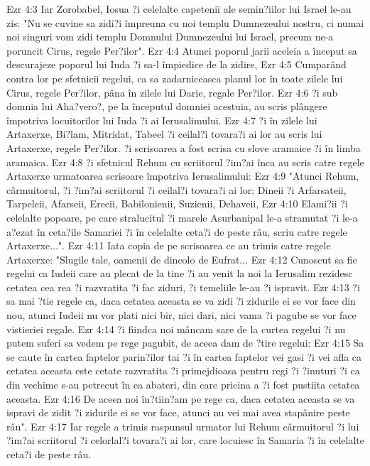 Ezr 4:3  Iar Zorobabel, Iosua ?i celelalte capetenii ale semin?iilor lui Israel le-au zis: "Nu se cuvine sa zidi?i împreuna cu noi templu Dumnezeului nostru, ci numai noi singuri vom zidi templu Domnului Dumnezeului lui Israel, precum ne-a poruncit Cirus, regele Per?ilor".
Ezr 4:4  Atunci poporul jarii aceleia a început sa descurajeze poporul lui Iuda ?i sa-l împiedice de la zidire,
Ezr 4:5  Cumparând contra lor pe sfetnicii regelui, ca sa zadarniceasca planul lor în toate zilele lui Cirus, regele Per?ilor, pâna în zilele lui Darie, regale Per?ilor.
Ezr 4:6  ?i sub domnia lui Aha?vero?, pe la începutul domniei acestuia, au scris plângere împotriva locuitorilor lui Iuda ?i ai Ierusalimului.
Ezr 4:7  ?i în zilele lui Artaxerxe, Bi?lam, Mitridat, Tabeel ?i ceilal?i tovara?i ai lor au scris lui Artaxerxe, regele Per?ilor. ?i scrisoarea a fost scrisa cu slove aramaice ?i în limba aramaica.
Ezr 4:8  ?i sfetnicul Rehum cu scriitorul ?im?ai înca au scris catre regele Artaxerxe urmatoarea scrisoare împotriva Ierusalimului:
Ezr 4:9  "Atunci Rehum, cârmuitorul, ?i ?im?ai scriitorul ?i ceilal?i tovara?i ai lor: Dineii ?i Arfarsateii, Tarpeleii, Afarseii, Erecii, Babilonienii, Suzienii, Dehaveii,
Ezr 4:10  Elami?ii ?i celelalte popoare, pe care stralucitul ?i marele Asurbanipal le-a stramutat ?i le-a a?ezat în ceta?ile Samariei ?i în celelalte ceta?i de peste râu, scriu catre regele Artaxerxe...".
Ezr 4:11  Iata copia de pe scrisoarea ce au trimis catre regele Artaxerxe: "Slugile tale, oamenii de dincolo de Eufrat...
Ezr 4:12  Cunoscut sa fie regelui ca Iudeii care au plecat de la tine ?i au venit la noi la Ierusalim rezidesc cetatea cea rea ?i razvratita ?i fac ziduri, ?i temeliile le-au ?i ispravit.
Ezr 4:13  ?i sa mai ?tie regele ca, daca cetatea aceasta se va zidi ?i zidurile ei se vor face din nou, atunci Iudeii nu vor plati nici bir, nici dari, nici vama ?i pagube se vor face vistieriei regale.
Ezr 4:14  ?i fiindca noi mâncam sare de la curtea regelui ?i nu putem suferi sa vedem pe rege pagubit, de aceea dam de ?tire regelui:
Ezr 4:15  Sa se caute în cartea faptelor parin?ilor tai ?i în cartea faptelor vei gasi ?i vei afla ca cetatea aceasta este cetate razvratita ?i primejdioasa pentru regi ?i ?inuturi ?i ca din vechime s-au petrecut în ea abateri, din care pricina a ?i fost pustiita cetatea aceasta.
Ezr 4:16  De aceea noi în?tiin?am pe rege ca, daca cetatea aceasta se va ispravi de zidit ?i zidurile ei se vor face, atunci nu vei mai avea stapânire peste râu".
Ezr 4:17  Iar regele a trimis raspunsul urmator lui Rehum cârmuitorul ?i lui ?im?ai scriitorul ?i celorlal?i tovara?i ai lor, care locuiesc în Samaria ?i în celelalte ceta?i de peste râu.
